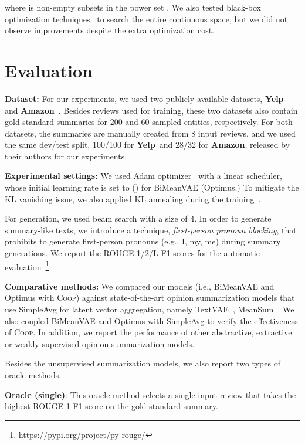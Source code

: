 \documentclass[11pt]{article}
\newcommand{\aggname}{\textsc{Coop}}
\newcommand{\name}{\mbox{\sc BiMeanVAE}}
\newcommand{\simpleavg}{\mbox{SimpleAvg}}
\newcommand{\yelp}{\mbox{\bf Yelp}}
\newcommand{\amazon}{\mbox{\bf Amazon}}
\newcommand{\hl}[1]{#1}
\newcommand{\hla}[1]{#1}
\begin{document}
where  is non-empty \hla{subsets} in the power set .
We also tested black-box 
optimization techniques~\cite{audet2017derivative}
to search the entire \hl{continuous} space, but we did not observe improvements despite the extra optimization cost.

\section{Evaluation}\label{sec:exp}
\noindent
{\bf Dataset:} For our experiments, we used two publicly available datasets, \yelp~\cite{Chu:2019:MeanSum} and \amazon~\cite{brazinskas-etal-2020-unsupervised}. Besides reviews used for training, these two datasets also contain gold-standard summaries for 200 and 60 sampled entities, respectively. For both datasets, the summaries are manually created from 8 input reviews, and we used the same dev/test split, 100/100 for \yelp\ and 28/32 for \amazon, released by their authors for our experiments. 

\noindent
{\bf Experimental settings:}
We used Adam optimizer~\cite{kingma2015adam} with a linear scheduler, whose initial learning rate is set to  () for \name{} (Optimus.)
To mitigate the KL vanishing issue, we also applied KL annealing during the training~\cite{kingma2016improved,fu-etal-2019-cyclical,li-etal-2019-surprisingly}.

For generation, we used beam search with a size of 4.
In order to generate summary-like texts, we introduce a technique, \textit{first-person pronoun blocking}, that prohibits to generate first-person pronouns (e.g., I, my, me) during summary generations.
We report the ROUGE-1/2/L F1 scores for the automatic evaluation~\cite{lin-2004-rouge}\footnote{\url{https://pypi.org/project/py-rouge/}}.

\noindent
{\bf Comparative methods:}
We compared our models (i.e., \name{} and Optimus with \aggname) against state-of-the-art opinion summarization models that use \simpleavg{} for latent vector aggregation, namely
TextVAE~\cite{bowman-etal-2016-generating},
MeanSum~\cite{Chu:2019:MeanSum}.
We also coupled \name{} and Optimus with \simpleavg{} to verify the effectiveness of \aggname.
\hl{In addition, we report the performance of other abstractive, extractive or weakly-supervised opinion summarization models.}

Besides the unsupervised summarization models, we also report \hl{two types of oracle methods.}

\noindent
{\bf Oracle (single)}: This oracle method selects a single input review that takes the highest ROUGE-1 F1 score on the gold-standard summary.
\end{document}
